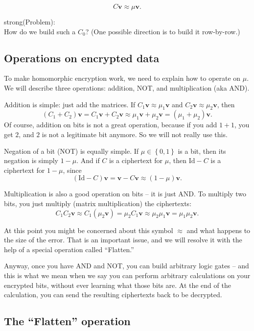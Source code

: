\[C\mathbf{v} \approx \mu\mathbf{v}.\]

strong(Problem):\\
How do we build such a \(C_{0}\)? (One possible direction is to build it
row-by-row.)

\subsection{Operations on encrypted data}

To make homomorphic encryption work, we need to explain how to operate
on \(\mu\). We will describe three operations: addition, NOT, and
multiplication (aka AND).

Addition is simple: just add the matrices. If
\(C_{1}\mathbf{v} \approx \mu_{1}\mathbf{v}\) and
\(C_{2}\mathbf{v} \approx \mu_{2}\mathbf{v}\), then
\[\left( C_{1} + C_{2} \right)\mathbf{v} = C_{1}\mathbf{v} + C_{2}\mathbf{v} \approx \mu_{1}\mathbf{v} + \mu_{2}\mathbf{v} = \left( \mu_{1} + \mu_{2} \right)\mathbf{v}.\]
Of course, addition on bits is not a great operation, because if you add
\(1 + 1\), you get \(2\), and \(2\) is not a legitimate bit anymore. So
we will not really use this.

Negation of a bit (NOT) is equally simple. If
\(\mu \in \left\{ 0,1 \right\}\) is a bit, then its negation is simply
\(1 - \mu\). And if \(C\) is a ciphertext for \(\mu\), then
\(\mathrm{\text{Id}} - C\) is a ciphertext for \(1 - \mu\), since
\[\left( \mathrm{\text{Id}} - C \right)\mathbf{v} = \mathbf{v} - C\mathbf{v} \approx (1 - \mu)\mathbf{v}.\]

Multiplication is also a good operation on bits -- it is just AND. To
multiply two bits, you just multiply (matrix multiplication) the
ciphertexts:
\[C_{1}C_{2}\mathbf{v} \approx C_{1}\left( \mu_{2}\mathbf{v} \right) = \mu_{2}C_{1}\mathbf{v} \approx \mu_{2}\mu_{1}\mathbf{v} = \mu_{1}\mu_{2}\mathbf{v}.\]

At this point you might be concerned about this symbol \(\approx\) and
what happens to the size of the error. That is an important issue, and
we will resolve it with the help of a special operation called
``Flatten.''

Anyway, once you have AND and NOT, you can build arbitrary logic gates
-- and this is what we mean when we say you can perform arbitrary
calculations on your encrypted bits, without ever learning what those
bits are. At the end of the calculation, you can send the resulting
ciphertexts back to be decrypted.

\subsection{The ``Flatten''
operation}\label{a-constraint-on-the-secret-key-mathbfv-and-the-flatten-operation}

